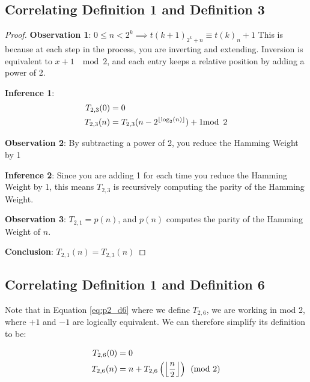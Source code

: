 \documentclass[conference]{IEEEtran}
\begin{document}
\subsection{Correlating Definition 1 and Definition 3}

\begin{proof}
\par\noindent\par
    \textbf{Observation 1}: $0 \le n < 2^k \implies t(k+1)_{2^k + n} \equiv t(k)_n + 1$
    This is because at each step in the process, you are inverting and extending. Inversion is equivalent to $x + 1 \; \mod{2}$, and each entry keeps a relative position by adding a power of 2.

    \textbf{Inference 1}: \begin{equation}
        \begin{aligned}
            T_{2,3}(0) &= 0 \\
            T_{2,3}(n) &= T_{2,3}(n - 2^{\floor{\log_2(n)}}) + 1 \mod{2}
        \end{aligned}
    \end{equation}

    \textbf{Observation 2}: By subtracting a power of 2, you reduce the Hamming Weight by 1

    \textbf{Inference 2}: Since you are adding 1 for each time you reduce the Hamming Weight by 1, this means $T_{2,3}$ is recursively computing the parity of the Hamming Weight.

    \textbf{Observation 3}: $T_{2,1} = p(n)$, and $p(n)$ computes the parity of the Hamming Weight of $n$.

    \textbf{Conclusion}: $T_{2,1}(n) = T_{2,3}(n)$
\end{proof}

\subsection{Correlating Definition 1 and Definition 6}

Note that in Equation \ref{eq:p2_d6} where we define $T_{2,6}$, we are working in mod 2, where $+1$ and $-1$ are logically equivalent. We can therefore simplify its definition to be:

\begin{equation}
    \label{eq:p2d06s}
    \begin{aligned}
T_{2,6}(0) &= 0 \\
T_{2,6}(n) &= n + T_{2,6}\left(\floor{\dfrac{n}{2}}\right) \pmod{2}
    \end{aligned}
\end{equation}
\end{document}
